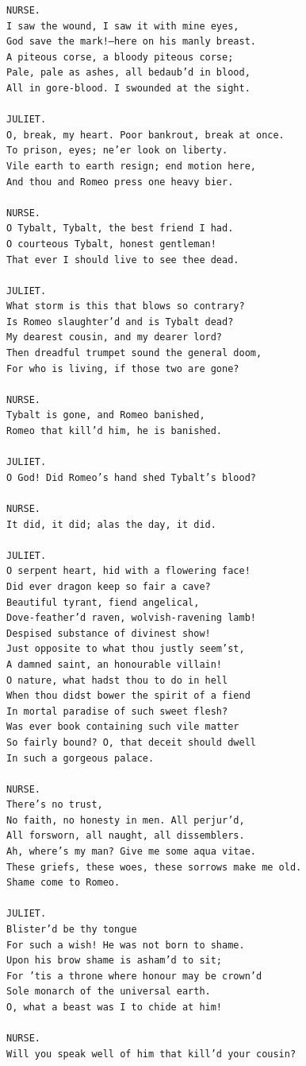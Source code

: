 \documentclass{article}
\begin{document}
\begin{verbatim}
NURSE.
I saw the wound, I saw it with mine eyes,
God save the mark!—here on his manly breast.
A piteous corse, a bloody piteous corse;
Pale, pale as ashes, all bedaub’d in blood,
All in gore-blood. I swounded at the sight.

JULIET.
O, break, my heart. Poor bankrout, break at once.
To prison, eyes; ne’er look on liberty.
Vile earth to earth resign; end motion here,
And thou and Romeo press one heavy bier.

NURSE.
O Tybalt, Tybalt, the best friend I had.
O courteous Tybalt, honest gentleman!
That ever I should live to see thee dead.

JULIET.
What storm is this that blows so contrary?
Is Romeo slaughter’d and is Tybalt dead?
My dearest cousin, and my dearer lord?
Then dreadful trumpet sound the general doom,
For who is living, if those two are gone?

NURSE.
Tybalt is gone, and Romeo banished,
Romeo that kill’d him, he is banished.

JULIET.
O God! Did Romeo’s hand shed Tybalt’s blood?

NURSE.
It did, it did; alas the day, it did.

JULIET.
O serpent heart, hid with a flowering face!
Did ever dragon keep so fair a cave?
Beautiful tyrant, fiend angelical,
Dove-feather’d raven, wolvish-ravening lamb!
Despised substance of divinest show!
Just opposite to what thou justly seem’st,
A damned saint, an honourable villain!
O nature, what hadst thou to do in hell
When thou didst bower the spirit of a fiend
In mortal paradise of such sweet flesh?
Was ever book containing such vile matter
So fairly bound? O, that deceit should dwell
In such a gorgeous palace.

NURSE.
There’s no trust,
No faith, no honesty in men. All perjur’d,
All forsworn, all naught, all dissemblers.
Ah, where’s my man? Give me some aqua vitae.
These griefs, these woes, these sorrows make me old.
Shame come to Romeo.

JULIET.
Blister’d be thy tongue
For such a wish! He was not born to shame.
Upon his brow shame is asham’d to sit;
For ’tis a throne where honour may be crown’d
Sole monarch of the universal earth.
O, what a beast was I to chide at him!

NURSE.
Will you speak well of him that kill’d your cousin?


\end{verbatim}
\end{document}
